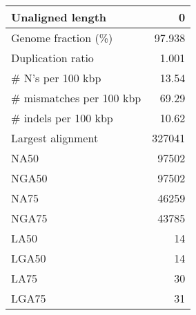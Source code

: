 \documentclass[12pt,a4paper]{article}
\begin{document}
\begin{table}[ht]
\begin{center}
\begin{tabular}{|l*{1}{|r}|}
Unaligned length & 0 \\ \hline
Genome fraction (\%) & 97.938 \\ \hline
Duplication ratio & 1.001 \\ \hline
\# N's per 100 kbp & 13.54 \\ \hline
\# mismatches per 100 kbp & 69.29 \\ \hline
\# indels per 100 kbp & 10.62 \\ \hline
Largest alignment & 327041 \\ \hline
NA50 & 97502 \\ \hline
NGA50 & 97502 \\ \hline
NA75 & 46259 \\ \hline
NGA75 & 43785 \\ \hline
LA50 & 14 \\ \hline
LGA50 & 14 \\ \hline
LA75 & 30 \\ \hline
LGA75 & 31 \\ \hline
\end{tabular}
\end{center}
\end{table}
\end{document}
